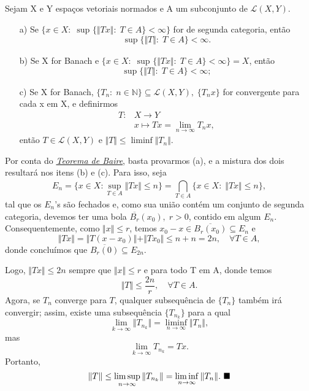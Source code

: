 \documentclass[../functional_analysis.tex]{subfiles}
\begin{document}
\hypertarget{uniform_limitation}{
	\begin{theorem*}
		Sejam X e Y espaços vetoriais normados e A um subconjunto de \(\mathcal{L}(X, Y)\).
		\begin{itemize}
			\item[a)] Se \(\{x\in X:\; \sup_{}\{\Vert Tx \Vert:\; T\in A\} < \infty\}\) for de segunda categoria, então
			      \[
				      \sup_{}\{\Vert T \Vert:\; T\in A\} < \infty.
			      \]
			\item[b)] Se X for Banach e \(\{x\in X:\; \sup_{}\{\Vert Tx \Vert:\; T\in A\} < \infty\} = X\), então
			      \[
				      \sup_{}\{\Vert T \Vert:\; T\in A\} < \infty;
			      \]
			\item[c)] Se X for Banach, \(\{T_{n}:\; n\in \mathbb{N}\} \subseteq \mathcal{L}(X, Y),\; \{T_{n}x\}\) for convergente para cada x em X, e definirmos
			      \begin{align*}
				      T: & X\rightarrow Y                              \\
				         & x\longmapsto Tx = \lim_{n\to \infty}T_{n}x,
			      \end{align*}
			      então \(T\in \mathcal{L}(X, Y)\) e \(\Vert T \Vert \leq \liminf \Vert T_{n} \Vert.\)
		\end{itemize}
	\end{theorem*}
}
\begin{proof*}
	Por conta do \hyperlink{baire_theorem}{\textit{Teorema de Baire}}, basta provarmos (a), e a mistura dos dois resultará nos itens (b) e (c). Para isso, seja
	\[
		E_{n} = \{x\in X: \sup_{T\in A}\Vert Tx \Vert\leq n\} = \bigcap_{T\in A}^{}\{x\in X:\; \Vert Tx \Vert \leq n\},
	\]
	tal que os \(E_{n}\)'s são fechados e, como sua união contém um conjunto de segunda categoria, devemos ter uma bola \(\overline{B_r}(x_{0}),\; r > 0\), contido em algum \(E_{n}\).
	Consequentemente, como \(\Vert x \Vert \leq r\), temos \(x_{0}-x\in \overline{B_r(x_{0})}\subseteq E_{n}\) e
	\[
		\Vert Tx \Vert = \Vert T(x-x_{0}) \Vert + \Vert Tx_{0} \Vert \leq n+n = 2n, \quad \forall T\in A,
	\]
	donde concluímos que \(\overline{B_r(0)}\subseteq E_{2n}\).

	Logo, \(\Vert Tx \Vert \leq 2n\) sempre que \(\Vert x \Vert \leq r\) e para todo T em A, donde temos
	\[
		\Vert T \Vert \leq \frac{2n}{r}, \quad \forall T\in A.
	\]
	Agora, se \(T_{n}\) converge para \(T\), qualquer subsequência de \(\{T_{n}\}\) também irá convergir; assim, existe uma subsequência \(\{T_{n_k}\}\) para a qual
	\[
		\lim_{k\to \infty}\Vert T_{n_k}\Vert = \liminf_{n\to \infty}\Vert T_{n}\Vert,
	\]
	mas
	\[
		\lim_{k\to \infty}T_{n_k} = Tx.
	\]
	Portanto,
	\[
		\Vert T \Vert \leq \limsup_{n\to \infty}\Vert T_{n_k} \Vert = \liminf_{n\to \infty} \Vert T_{n} \Vert. \text{ $\blacksquare$}
	\]
\end{proof*}
\end{document}
